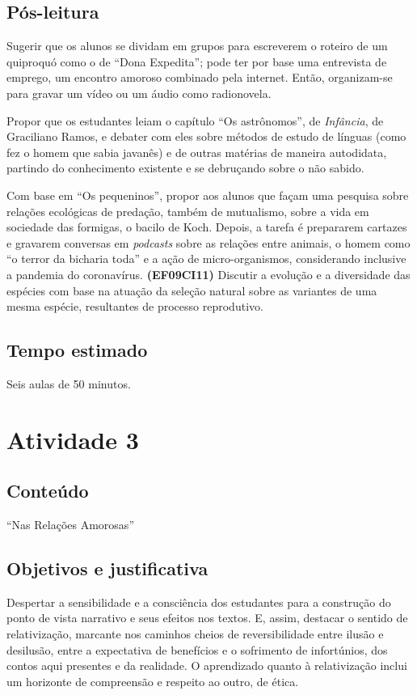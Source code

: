 \subsection{Pós-leitura}

Sugerir que os alunos se dividam em grupos para escreverem o roteiro de
um quiproquó como o de ``Dona Expedita''; pode ter por base uma
entrevista de emprego, um encontro amoroso combinado pela internet.
Então, organizam-se para gravar um vídeo ou um áudio como radionovela.

Propor que os estudantes leiam o capítulo ``Os astrônomos'', de
\emph{Infância}, de Graciliano Ramos, e debater com eles sobre métodos
de estudo de línguas (como fez o homem que sabia javanês) e de outras
matérias de maneira autodidata, partindo do conhecimento existente e se
debruçando sobre o não sabido.

Com base em ``Os pequeninos'', propor aos alunos que façam uma pesquisa
sobre relações ecológicas de predação, também de mutualismo, sobre a
vida em sociedade das formigas, o bacilo de Koch. Depois, a tarefa é
prepararem cartazes e gravarem conversas em \emph{podcasts} sobre as
relações entre animais, o homem como ``o terror da bicharia toda'' e a
ação de micro-organismos, considerando inclusive a pandemia do
coronavírus. \textbf{(EF09CI11)} Discutir
a evolução e a diversidade das espécies com base na atuação da seleção
natural sobre as variantes de uma mesma espécie, resultantes de processo
reprodutivo.

\subsection{Tempo estimado} Seis aulas de 50 minutos.

\section{Atividade 3}

\subsection{Conteúdo} ``Nas Relações Amorosas''

\subsection{Objetivos e justificativa}

Despertar a sensibilidade e a consciência dos estudantes para a
construção do ponto de vista narrativo e seus efeitos nos textos. E,
assim, destacar o sentido de relativização, marcante nos caminhos cheios
de reversibilidade entre ilusão e desilusão, entre a expectativa de
benefícios e o sofrimento de infortúnios, dos contos aqui presentes e da
realidade. O aprendizado quanto à relativização inclui um horizonte de
compreensão e respeito ao outro, de ética.

